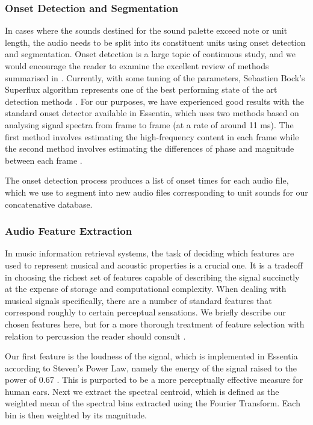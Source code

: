 \subsubsection{Onset Detection and Segmentation}

In cases where the sounds destined for the sound palette exceed note or unit length, the audio needs to be split into its constituent units using onset detection and segmentation.
Onset detection is a large topic of continuous study, and we would encourage the reader to examine the excellent review of methods summarised in \citep{Dixon2006}. Currently, with some tuning of the parameters, Sebastien Bock’s Superflux algorithm represents one of the best performing state of the art detection methods \citep{Bock2013}. For our purposes, we have experienced good results with the standard onset detector available in Essentia, which uses two methods based on analysing signal spectra from frame to frame (at a rate of around 11 ms). The first method involves estimating the high-frequency content in each frame
\citep{Masri1996} while the second method involves estimating the differences of phase and magnitude between each frame \citep{Bello2005}.

The onset detection process produces a list of onset times for each audio file, which we use to segment into new audio files corresponding to unit sounds for our concatenative database.

\subsubsection{Audio Feature Extraction}

In music information retrieval systems, the task of deciding which features are used to represent musical and acoustic properties is a crucial one. It is a tradeoff in choosing the richest set of features capable of describing the signal succinctly at the expense of storage and computational complexity. When dealing with musical signals specifically, there are a number of standard features that correspond roughly to certain perceptual sensations. We briefly describe our chosen features here, but for a more thorough treatment of feature selection with relation to percussion the reader should consult \citep{Herrera2003, Roy2007b, Tindale2004, Tindale2004a}.

Our first feature is the loudness of the signal, which is implemented in Essentia according to Steven’s Power Law, namely the energy of the signal raised to the power of 0.67 \citep{Bogdanov2013}. This is purported to be a more perceptually effective measure for human ears. Next we extract the spectral centroid, which is defined as the weighted mean of the spectral bins extracted using the Fourier Transform. Each bin is then weighted by its magnitude.

